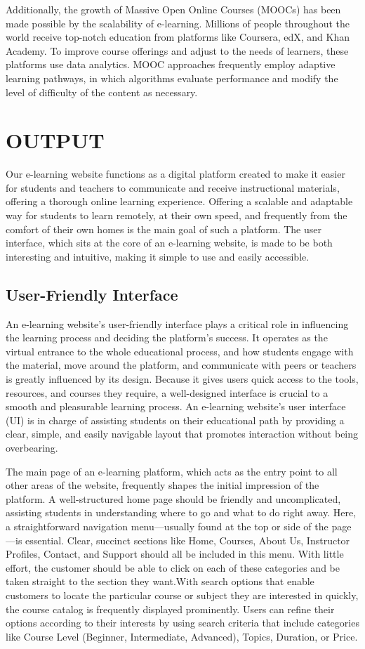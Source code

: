 \documentclass[BTech]{audiss}
\begin{document}
Additionally, the growth of Massive Open Online Courses (MOOCs) has been made possible by the scalability of e-learning. Millions of people throughout the world receive top-notch education from platforms like Coursera, edX, and Khan Academy. To improve course offerings and adjust to the needs of learners, these platforms use data analytics. MOOC approaches frequently employ adaptive learning pathways, in which algorithms evaluate performance and modify the level of difficulty of the content as necessary.
\newpage
\section{OUTPUT}
Our e-learning website functions as a digital platform created to make it easier for students and teachers to communicate and receive instructional materials, offering a thorough online learning experience. Offering a scalable and adaptable way for students to learn remotely, at their own speed, and frequently from the comfort of their own homes is the main goal of such a platform. The user interface, which sits at the core of an e-learning website, is made to be both interesting and intuitive, making it simple to use and easily accessible.

\subsection{User-Friendly Interface}
An e-learning website's user-friendly interface plays a critical role in influencing the learning process and deciding the platform's success. It operates as the virtual entrance to the whole educational process, and how students engage with the material, move around the platform, and communicate with peers or teachers is greatly influenced by its design. Because it gives users quick access to the tools, resources, and courses they require, a well-designed interface is crucial to a smooth and pleasurable learning process. An e-learning website's user interface (UI) is in charge of assisting students on their educational path by providing a clear, simple, and easily navigable layout that promotes interaction without being overbearing.

The main page of an e-learning platform, which acts as the entry point to all other areas of the website, frequently shapes the initial impression of the platform. A well-structured home page should be friendly and uncomplicated, assisting students in understanding where to go and what to do right away. Here, a straightforward navigation menu---usually found at the top or side of the page---is essential. Clear, succinct sections like Home, Courses, About Us, Instructor Profiles, Contact, and Support should all be included in this menu. With little effort, the customer should be able to click on each of these categories and be taken straight to the section they want.With search options that enable customers to locate the particular course or subject they are interested in quickly, the course catalog is frequently displayed prominently. Users can refine their options according to their interests by using search criteria that include categories like Course Level (Beginner, Intermediate, Advanced), Topics, Duration, or Price.
\end{document}
